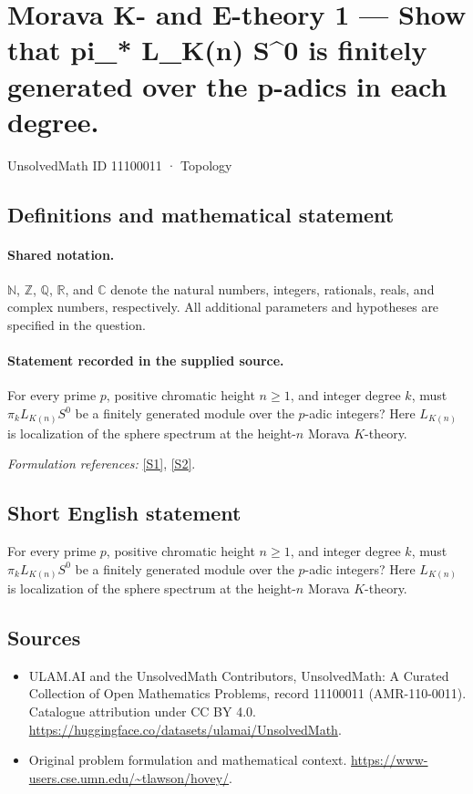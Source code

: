 \documentclass[11pt]{article}
\newcommand{\sref}[2]{\hyperlink{source:#1:#2}{[S#2]}}
\begin{document}
\setcounter{section}{11100010}
\section{Morava K- and E-theory 1 — Show that pi\_* L\_K(n) S\textasciicircum{}0 is finitely generated over the p-adics in each degree.}\label{11100011}
{\small UnsolvedMath ID 11100011 · Topology}
\subsection{Definitions and mathematical statement}

\paragraph{Shared notation.}$\mathbb N$, $\mathbb Z$, $\mathbb Q$, $\mathbb R$, and $\mathbb C$ denote the natural numbers, integers, rationals, reals, and complex numbers, respectively. All additional parameters and hypotheses are specified in the question.


\paragraph{Statement recorded in the supplied source.}
For every prime $p$, positive chromatic height $n\ge1$, and integer degree $k$, must $\pi_kL_{K(n)}S^0$ be a finitely generated module over the $p$-adic integers? Here $L_{K(n)}$ is localization of the sphere spectrum at the height-$n$ Morava $K$-theory.
\par\smallskip\textit{Formulation references:} \sref{11100011}{1}, \sref{11100011}{2}.
\subsection{Short English statement}
For every prime $p$, positive chromatic height $n\ge1$, and integer degree $k$, must $\pi_kL_{K(n)}S^0$ be a finitely generated module over the $p$-adic integers? Here $L_{K(n)}$ is localization of the sphere spectrum at the height-$n$ Morava $K$-theory.
\subsection{Sources}
\begin{itemize}
\item[\hypertarget{source:11100011:1}{S1}] ULAM.AI and the UnsolvedMath Contributors, UnsolvedMath: A Curated Collection of Open Mathematics Problems, record 11100011 (AMR-110-0011). Catalogue attribution under CC BY 4.0.
\url{https://huggingface.co/datasets/ulamai/UnsolvedMath}.
\item[\hypertarget{source:11100011:2}{S2}] Original problem formulation and mathematical context.
\url{https://www-users.cse.umn.edu/~tlawson/hovey/}.
\end{itemize}
\label{end:11100011}
\end{document}
